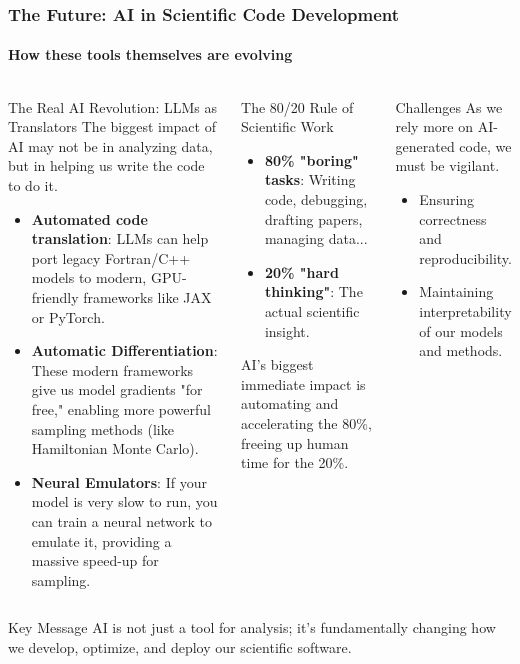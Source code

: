 \documentclass[aspectratio=169]{beamer}
\newcommand{\keyterm}[1]{\textbf{\textcolor{C0}{#1}}}
\begin{document}
\begin{frame}
    \frametitle{The Future: AI in Scientific Code Development}
    \framesubtitle{How these tools themselves are evolving}
    \begin{columns}[T]
        \begin{block}{The Real AI Revolution: LLMs as Translators}
            The biggest impact of AI may not be in analyzing data, but in helping us write the code to do it.
            \begin{itemize}
                \item \keyterm{Automated code translation}: LLMs can help port legacy Fortran/C++ models to modern, GPU-friendly frameworks like JAX or PyTorch.
                \item \keyterm{Automatic Differentiation}: These modern frameworks give us model gradients "for free," enabling more powerful sampling methods (like Hamiltonian Monte Carlo).
                \item \keyterm{Neural Emulators}: If your model is very slow to run, you can train a neural network to emulate it, providing a massive speed-up for sampling.
            \end{itemize}
        \end{block}
        
        \begin{block}{The 80/20 Rule of Scientific Work}
            \begin{itemize}
                \item \textbf{80\% "boring" tasks}: Writing code, debugging, drafting papers, managing data...
                \item \textbf{20\% "hard thinking"}: The actual scientific insight.
            \end{itemize}
            AI's biggest immediate impact is automating and accelerating the 80\%, freeing up human time for the 20\%.
        \end{block}
        
        \begin{block}{Challenges}
            As we rely more on AI-generated code, we must be vigilant.
            \begin{itemize}
                \item Ensuring correctness and reproducibility.
                \item Maintaining interpretability of our models and methods.
            \end{itemize}
        \end{block}
    \end{columns}
    
    \begin{alertblock}{Key Message}
        AI is not just a tool for analysis; it's fundamentally changing how we develop, optimize, and deploy our scientific software.
    \end{alertblock}
\end{frame}
\end{document}
